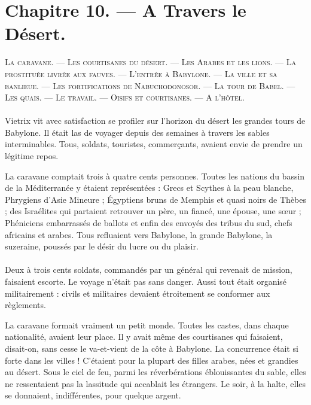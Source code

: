 \documentclass[a4paper, 11pt, oneside, polutonikogreek, french]{article}
\begin{document}
\section{Chapitre 10. --- A Travers le Désert.}
\begin{center}
\scshape
\small
La caravane. --- Les courtisanes du désert. --- Les Arabes et les lions. --- La prostituée livrée aux fauves. --- L'entrée à Babylone. --- La ville et sa banlieue. --- Les fortifications de Nabuchodonosor. --- La tour de Babel. --- Les quais. --- Le travail. --- Oisifs et courtisanes. --- A l'hôtel.
\end{center}
\paragraph{}
Vietrix vit avec satisfaction se profiler sur l'horizon du désert les grandes tours de Babylone. Il était las de voyager depuis des semaines à travers les sables interminables. Tous, soldats, touristes, commerçants, avaient envie de prendre un légitime repos.

La caravane comptait trois à quatre cents personnes. Toutes les nations du bassin de la Méditerranée y étaient représentées : Grecs et Scythes à la peau blanche, Phrygiens d'Asie Mineure ; Égyptiens bruns de Memphis et quasi noirs de Thèbes ; des Israélites qui partaient retrouver un père, un fiancé, une épouse, une sœur ; Phéniciens embarrassés de ballots et enfin des envoyés des tribus du sud, chefs africains et arabes. Tous refluaient vers Babylone, la grande Babylone, la suzeraine, poussés par le désir du lucre ou du plaisir.
\clearpage
\paragraph{}
Deux à trois cents soldats, commandés par un général qui revenait de mission, faisaient escorte. Le voyage n'était pas sans danger. Aussi tout était organisé militairement : civils et militaires devaient étroitement se conformer aux règlements.

\bigskip
\centerline{\EightStarTaper}
\centerline{\EightStarTaper\EightStarTaper}
\bigskip

La caravane formait vraiment un petit monde. Toutes les castes, dans chaque nationalité, avaient leur place. Il y avait même des courtisanes qui faisaient, disait-on, sans cesse le va-et-vient de la côte à Babylone. La concurrence était si forte dans les villes ! C'étaient pour la plupart des filles arabes, nées et grandies au désert. Sous le ciel de feu, parmi les réverbérations éblouissantes du sable, elles ne ressentaient pas la lassitude qui accablait les étrangers. Le soir, à la halte, elles se donnaient, indifférentes, pour quelque argent.
\end{document}
